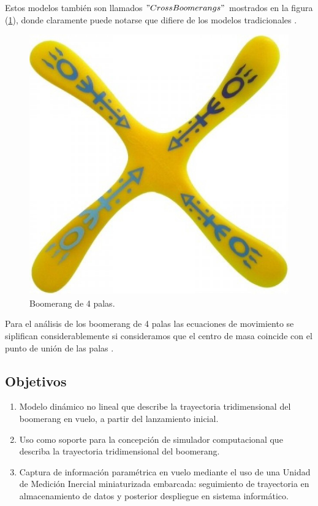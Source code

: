 	Estos modelos también son llamados $"Cross Boomerangs"$ mostrados en la figura (\ref{fig1}), donde claramente puede notarse que difiere de los modelos tradicionales \cite{kuleshov}.
	\begin{figure}[h]
		\begin{center}
		\includegraphics[scale=0.2]{imagenes/3-boomerang/boomerang4palas.jpg}
		\caption{Boomerang de 4 palas.}
   	    \label{fig1}
		\end{center}
	\end{figure}

	Para el análisis de los boomerang de 4 palas las ecuaciones de movimiento se siplifican considerablemente si consideramos que el centro de masa coincide con el punto de unión de las palas \cite{barger1973}.

	\subsection{Objetivos}

	\begin{enumerate}
	\item Modelo dinámico no lineal que describe la
	trayectoria tridimensional del boomerang en
	vuelo, a partir del lanzamiento inicial.

	\item Uso como soporte para la concepción de
	simulador computacional que describa la
	trayectoria tridimensional del boomerang.

	\item Captura de información paramétrica en vuelo
	mediante el uso de una Unidad de Medición
	Inercial miniaturizada embarcada: seguimiento de trayectoria en
	almacenamiento de datos y posterior despliegue en sistema informático.
	\end{enumerate}

